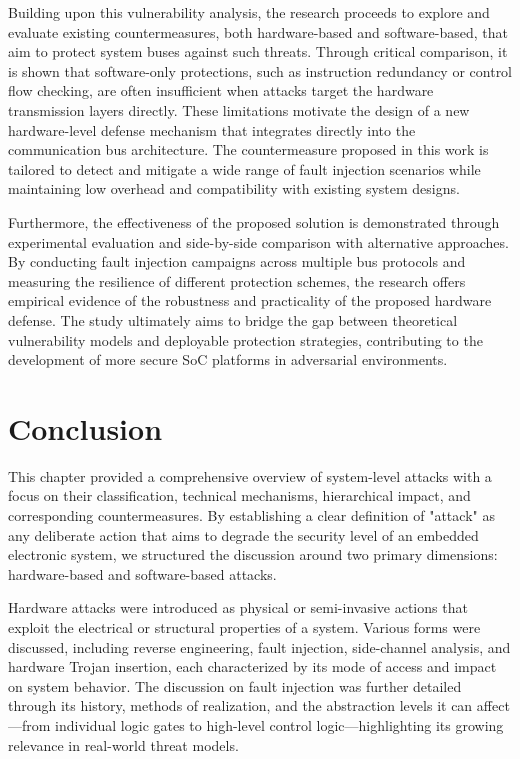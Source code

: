Building upon this vulnerability analysis, the research proceeds to explore and evaluate existing countermeasures, both hardware-based and software-based, that aim to protect system buses against such threats. Through critical comparison, it is shown that software-only protections, such as instruction redundancy or control flow checking, are often insufficient when attacks target the hardware transmission layers directly. These limitations motivate the design of a new hardware-level defense mechanism that integrates directly into the communication bus architecture. The countermeasure proposed in this work is tailored to detect and mitigate a wide range of fault injection scenarios while maintaining low overhead and compatibility with existing system designs.

Furthermore, the effectiveness of the proposed solution is demonstrated through experimental evaluation and side-by-side comparison with alternative approaches. By conducting fault injection campaigns across multiple bus protocols and measuring the resilience of different protection schemes, the research offers empirical evidence of the robustness and practicality of the proposed hardware defense. The study ultimately aims to bridge the gap between theoretical vulnerability models and deployable protection strategies, contributing to the development of more secure SoC platforms in adversarial environments.

\section{Conclusion}
This chapter provided a comprehensive overview of system-level attacks with a focus on their classification, technical mechanisms, hierarchical impact, and corresponding countermeasures. By establishing a clear definition of "attack" as any deliberate action that aims to degrade the security level of an embedded electronic system, we structured the discussion around two primary dimensions: hardware-based and software-based attacks.

Hardware attacks were introduced as physical or semi-invasive actions that exploit the electrical or structural properties of a system. Various forms were discussed, including reverse engineering, fault injection, side-channel analysis, and hardware Trojan insertion, each characterized by its mode of access and impact on system behavior. The discussion on fault injection was further detailed through its history, methods of realization, and the abstraction levels it can affect—from individual logic gates to high-level control logic—highlighting its growing relevance in real-world threat models.


